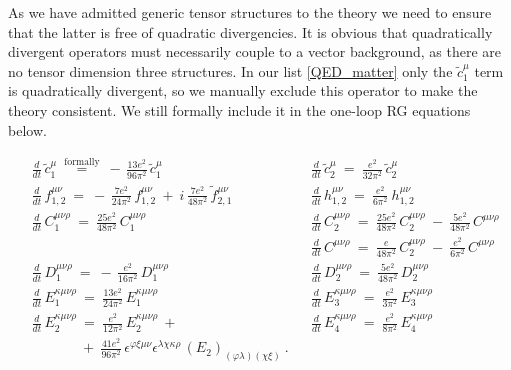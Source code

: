 \documentclass[12pt]{revtex4}
\newcommand{\wt}{\widetilde}
\begin{document}
	As we have admitted generic tensor structures to the theory
	we need to ensure that the latter is free of quadratic divergencies.
	It is obvious that quadratically divergent operators must necessarily
	couple to a vector background, as there are no tensor dimension
	three structures. 
	In our list \eqref{QED_matter} only the $ \wt{c}_1^\mu $ term is
	quadratically divergent, so we manually exclude this operator
	to make the theory consistent.
	We still formally include it in the one-loop RG equations below.

\begin{align*}
	&
	\frac{d} {d t}\, \wt{c}_1^\mu ~\overset{\text{formally}}{=}~
		-\, \frac{13e^2}{96\pi^2}\, \wt{c}_1^\mu
	&&
	\frac{d} {d t}\, \wt{c}_2^\mu ~=~
		\frac{e^2}{32\pi^2}\, \wt{c}_2^\mu
	\\
	&
	\frac{d} {d t}\, f_{1,2}^{\mu\nu} ~=~
		-\, \frac{7e^2}{24\pi^2}\, f_{1,2}^{\mu\nu}
		~+~
		i\, \frac{7e^2}{48\pi^2}\, \wt{f}{}_{2,1}^{\mu\nu}
	&&
	\frac{d} {d t}\, h_{1,2}^{\mu\nu} ~=~
		\frac{e^2}{6\pi^2}\ h_{1,2}^{\mu\nu} 
	\\
	&
	\frac{d} {d t}\, C_1^{\mu\nu\rho} ~=~
		\frac{25e^2}{48\pi^2}\, C_1^{\mu\nu\rho}
	&&
	\frac{d} {d t}\, C_2^{\mu\nu\rho} ~=~
		\frac{25e^2}{48\pi^2}\, C_2^{\mu\nu\rho}
		~-~
		\frac{5e^2}{48\pi^2}\, C^{\mu\nu\rho}
	\\
	&&&
	\frac{d} {d t}\, C^{\mu\nu\rho} ~=~
		\frac{e}{48\pi^2}\, C_2^{\mu\nu\rho} 
		~-~
		\frac{e^2}{6\pi^2}\, C^{\mu\nu\rho}
	\\
	&
	\frac{d} {d t}\, D_1^{\mu\nu\rho} ~=~
		-\, \frac{e^2}{16\pi^2}\, D_1^{\mu\nu\rho}
	&&
	\frac{d} {d t}\, D_2^{\mu\nu\rho} ~=~
		\frac{5e^2}{48\pi^2}\, D_2^{\mu\nu\rho}
	\\
	&
	\frac{d} {d t}\, E_1^{\kappa\mu\nu\rho} ~=~
		\frac{13e^2}{24\pi^2}\, E_1^{\kappa\mu\nu\rho}
	&&
	\frac{d} {d t}\, E_3^{\kappa\mu\nu\rho} ~=~
		\frac{e^2}{3\pi^2}\, E_3^{\kappa\mu\nu\rho}
	\\
	&
	\frac{d} {d t}\, E_2^{\kappa\mu\nu\rho} ~=~
		\frac{e^2}{12\pi^2}\, E_2^{\kappa\mu\nu\rho}
		~+~      
	&&
	\frac{d} {d t}\, E_4^{\kappa\mu\nu\rho} ~=~
		\frac{e^2}{8\pi^2}\, E_4^{\kappa\mu\nu\rho}
	\\
	&
	\phantom{\frac{d} {d t}\, E_2^{\kappa\mu\nu\rho}}
		~+~ \frac{41e^2}{96\pi^2}\,
		\epsilon^{\varphi\xi\mu\nu} 
		\epsilon^{\lambda\chi\kappa\rho}\,
		(E_2)_{(\varphi\lambda)(\chi\xi)}
	~.
\end{align*}	
\end{document}
